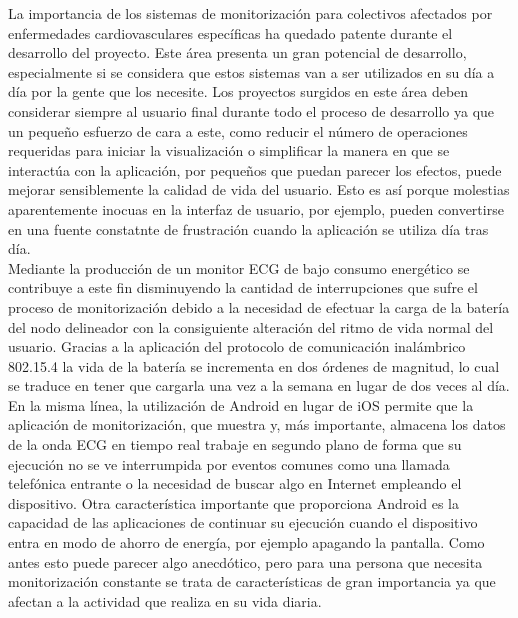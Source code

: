 	La importancia de los sistemas de monitorización para colectivos afectados por enfermedades cardiovasculares específicas ha quedado patente durante el desarrollo del proyecto. Este área presenta un gran potencial de desarrollo, especialmente si se considera que estos sistemas van a ser utilizados en su día a día por la gente que los necesite. Los proyectos surgidos en este área deben considerar siempre al usuario final durante todo el proceso de desarrollo ya que un pequeño esfuerzo de cara a este, como reducir el número de operaciones requeridas para iniciar la visualización o simplificar la manera en que se interactúa con la aplicación, por pequeños que puedan parecer los efectos, puede mejorar sensiblemente la calidad de vida del usuario. Esto es así porque molestias aparentemente inocuas en la interfaz de usuario, por ejemplo, pueden convertirse en una fuente constatnte de frustración cuando la aplicación se utiliza día tras día.\\

	Mediante la producción de un monitor ECG de bajo consumo energético se contribuye a este fin disminuyendo la cantidad de interrupciones que sufre el proceso de monitorización debido a la necesidad de efectuar la carga de la batería del nodo delineador con la consiguiente alteración del ritmo de vida normal del usuario. Gracias a la aplicación del protocolo de comunicación inalámbrico 802.15.4 la vida de la batería se incrementa en dos órdenes de magnitud, lo cual se traduce en tener que cargarla una vez a la semana en lugar de dos veces al día.\\

	En la misma línea, la utilización de Android en lugar de iOS permite que la aplicación de monitorización, que muestra y, más importante, almacena los datos de la onda ECG en tiempo real trabaje en segundo plano de forma que su ejecución no se ve interrumpida por eventos comunes como una llamada telefónica entrante o la necesidad de buscar algo en Internet empleando el dispositivo. Otra característica importante que proporciona Android es la capacidad de las aplicaciones de continuar su ejecución cuando el dispositivo entra en modo de ahorro de energía, por ejemplo apagando la pantalla. Como antes esto puede parecer algo anecdótico, pero para una persona que necesita monitorización constante se trata de características de gran importancia ya que afectan a la actividad que realiza en su vida diaria.\\

